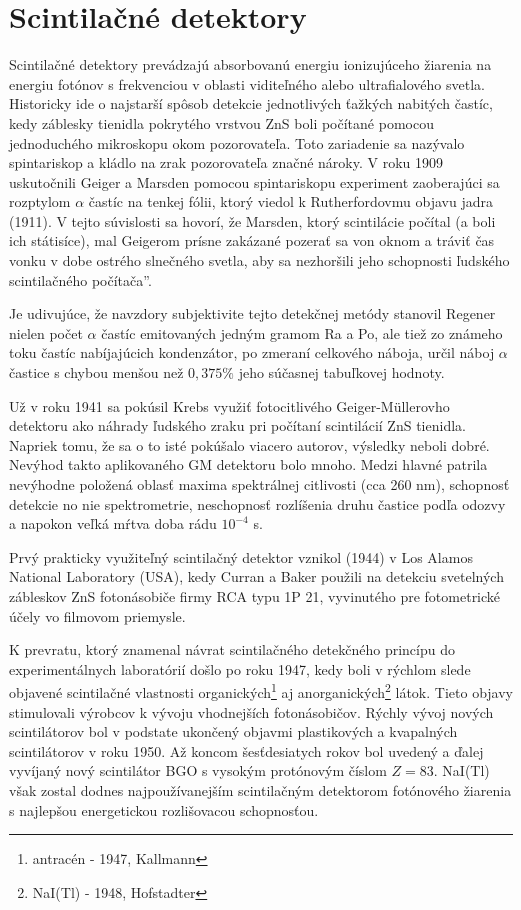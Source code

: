 \documentclass[../../main.tex]{subfiles}
\begin{document}
\section{Scintilačné detektory}

Scintilačné detektory prevádzajú absorbovanú energiu ionizujúceho žiarenia na energiu fotónov s frekvenciou v oblasti viditeľného alebo ultrafialového svetla. Historicky ide o najstarší spôsob detekcie jednotlivých ťažkých nabitých častíc, kedy záblesky tienidla pokrytého vrstvou ZnS boli počítané pomocou jednoduchého mikroskopu okom pozorovateľa. Toto zariadenie sa nazývalo spintariskop a kládlo na zrak pozorovateľa značné nároky. V roku 1909 uskutočnili Geiger a Marsden pomocou spintariskopu experiment zaoberajúci sa rozptylom $\alpha$ častíc na tenkej fólii, ktorý viedol k Rutherfordovmu objavu jadra (1911). V tejto súvislosti sa hovorí, že Marsden, ktorý scintilácie počítal (a boli ich státisíce), mal Geigerom prísne zakázané pozerať sa von oknom a tráviť čas vonku v dobe ostrého slnečného svetla, aby sa nezhoršili jeho schopnosti \quotedblbase ľudského scintilačného počítača\textquotedblright .

Je udivujúce, že navzdory subjektivite tejto detekčnej metódy stanovil Regener nielen počet $\alpha$ častíc emitovaných jedným gramom Ra a Po, ale tiež zo známeho toku častíc nabíjajúcich kondenzátor, po zmeraní celkového náboja, určil náboj $\alpha$ častice s chybou menšou než $0,375\%$ jeho súčasnej tabuľkovej hodnoty.

Už v roku 1941 sa pokúsil Krebs využiť fotocitlivého Geiger-M\"ullerovho detektoru ako náhrady ľudského zraku pri počítaní scintilácií ZnS tienidla. Napriek tomu, že sa o to isté pokúšalo viacero autorov, výsledky neboli dobré. Nevýhod takto aplikovaného GM detektoru bolo mnoho. Medzi hlavné patrila nevýhodne položená oblasť maxima spektrálnej citlivosti (cca 260 nm), schopnosť detekcie no nie spektrometrie, neschopnosť rozlíšenia druhu častice podľa odozvy a napokon veľká mŕtva doba rádu $10^{-4}$ s.

Prvý prakticky využiteľný scintilačný detektor vznikol (1944) v Los Alamos National Laboratory (USA), kedy Curran a Baker použili na detekciu svetelných zábleskov ZnS fotonásobiče firmy RCA typu 1P 21, vyvinutého pre fotometrické účely vo filmovom priemysle.

K prevratu, ktorý znamenal návrat scintilačného detekčného  princípu do experimentálnych laboratórií došlo po roku 1947, kedy boli v rýchlom slede objavené scintilačné vlastnosti organických\footnote{antracén - 1947, Kallmann} aj anorganických\footnote{NaI(Tl) - 1948, Hofstadter} látok. Tieto objavy stimulovali výrobcov k vývoju vhodnejších fotonásobičov. Rýchly vývoj nových scintilátorov bol v podstate ukončený objavmi plastikových a kvapalných scintilátorov v roku 1950. Až koncom šesťdesiatych rokov bol uvedený a ďalej vyvíjaný nový scintilátor BGO s vysokým protónovým číslom $Z=83$. NaI(Tl) však zostal dodnes najpoužívanejším scintilačným detektorom fotónového žiarenia s najlepšou energetickou rozlišovacou schopnosťou.
\end{document}
